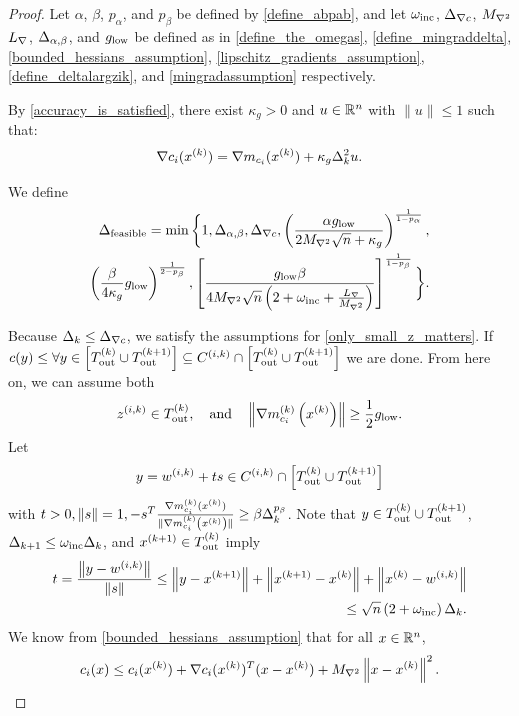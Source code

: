 \begin{proof}

Let
$\alpha$, $\beta$, $p_{\alpha}$, and $p_{\beta}$
be defined by
\cref{define_abpab},
and let
$\omega_{\text{inc}}$,
${\Delta_{\nabla c}}$,
${M_{\nabla^2}}$
${L_{\nabla}}$,
${\Delta_{\alpha,\beta}}$,
and ${ g_{\textrm{low}} }$
be defined as in
\cref{define_the_omegas},
\cref{define_mingraddelta},
\cref{bounded_hessians_assumption},
\cref{lipschitz_gradients_assumption},
\cref{define_deltalargzik},
and \cref{mingradassumption}
respectively.

By \cref{accuracy_is_satisfied}, there exist $\kappa_g > 0$ and $u\in\mathbb R^n$ with $\|u\|\le 1$ such that:
\begin{align}
\nabla c_i(x^{(k)}) = \nabla m_{c_i}(x^{(k)}) + \kappa_g\Delta_k^2 u. \label{model_error_for_gradient}
\end{align}

We define
\begin{align}
{\Delta_{\textrm{feasible}}} = \min\bigg\{
1,{\Delta_{\alpha,\beta}},
{\Delta_{\nabla c}},
\left(\frac{\alpha { g_{\textrm{low}} }}{2 {M_{\nabla^2}} \sqrt{n} + \kappa_g}\right)^{\frac 1 {1-p_{\alpha}}}, \nonumber \\
\left(\frac{\beta}{4\kappa_g}{ g_{\textrm{low}} }\right)^{\frac 1 {2 - p_{\beta}}}, 
\left[\frac {{ g_{\textrm{low}} }  \beta} {4{M_{\nabla^2}}\sqrt{n}\left(2 + \omega_{\text{inc}} + \frac {{L_{\nabla}}} {{M_{\nabla^2}}} \right)}\right]^{\frac1 {1 - p_{\beta}} }
\bigg\}. \label{define_delta_feasible}
\end{align}



Because $\Delta_k \le {\Delta_{\nabla c}}$, we satisfy the assumptions for \cref{only_small_z_matters}.
If $c(y) \le \forall y \in \left[{T_{\text{out}}^{(k)}} \cup {T_{\text{out}}^{(k+1)}}\right] \subseteq {C^{(i, k)}} \cap \left[{T_{\text{out}}^{(k)}} \cup {T_{\text{out}}^{(k+1)}}\right]$ we are done.
From here on, we can assume both
\begin{align}
{z^{(i, k)}} \in {T_{\text{out}}^{(k)}}, \quad \textrm{and} \quad \left\|{\nabla m_{c_i}^{(k)}\left(x^{(k)}\right)}\right\| \ge \frac 1 2 { g_{\textrm{low}} }. \label{z_is_active}
\end{align}
Let
\begin{align}
y = {w^{(i, k)}} + ts \in {C^{(i, k)}} \cap \left[{T_{\text{out}}^{(k)}} \cup {T_{\text{out}}^{(k+1)}}\right] \label{t_is_bounded}
\end{align}
with $t > 0, \|s\| = 1, -s^T{\frac{\nabla m^{(k)}_{c_i}(x^{(k)})}{\|\nabla m^{(k)}_{c_i}\left(x^{(k)}\right)\|}} \ge \beta \Delta_k^{p_{\beta}}$.
Note that $y \in {T_{\text{out}}^{(k)}} \cup {T_{\text{out}}^{(k+1)}}$, $\Delta_{k+1} \le \omega_{\text{inc}}\Delta_k$, and ${{x}^{(k+1)}} \in {T_{\text{out}}^{(k)}}$ imply
\begin{align}
\label{eccif_bound_t}
t = \frac{\left\|y - {w^{(i, k)}}\right\|}{\left\|s\right\|} 
\le \left\|y - {{x}^{(k+1)}}\right\| + \left\|{{x}^{(k+1)}} - x^{(k)}\right\| + \left\|x^{(k)} - {w^{(i, k)}}\right\| \\
\le \sqrt{n}\left(2 + \omega_{\text{inc}} \right)\Delta_k.
\end{align}
We know from \cref{bounded_hessians_assumption} that for all $x \in \mathbb R^n$,
\begin{align}
c_i(x) \le c_i(x^{(k)}) + \nabla c_i(x^{(k)})^T(x - x^{(k)}) + {M_{\nabla^2}} \left \|x - x^{(k)} \right\|^2. \label{constraint_lower_bound}
\end{align}


\end{proof}
